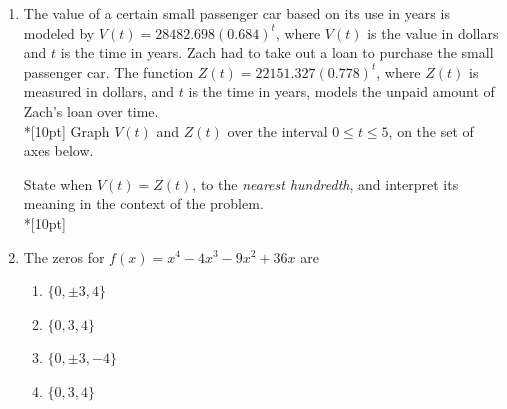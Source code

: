 \documentclass[12pt, oneside]{article}
\begin{document}
\begin{enumerate}
\newpage

\item The value of a certain small passenger car based on its use in years is modeled by $V(t) =28482.698(0.684)^t$, where $V(t)$ is the value in dollars and $t$ is the time in years. Zach had to take out a loan to purchase the small passenger car. The function $Z(t)=22151.327(0.778)^t$, where $Z(t)$ is measured in dollars, and $t$ is the time in years, models the unpaid amount of Zach’s loan over time.\\*[10pt]
Graph $V(t)$ and $Z(t)$ over the interval $0 \leq t \leq 5$, on the set of axes below.
\begin{center}
\end{center}
State when $V(t)=Z(t)$, to the \emph{nearest hundredth}, and interpret its meaning in the context of the problem.\\*[10pt]

\newpage
\item The zeros for $f(x)=x^4-4x^3-9x^2+36x$ are
\begin{enumerate}
    \item $\{0, \pm 3, 4 \}$
    \item $\{0, 3, 4 \}$
    \item $\{0, \pm 3, -4 \}$
    \item $\{0, 3,4 \}$
\end{enumerate} %


\end{enumerate}
\end{document}
